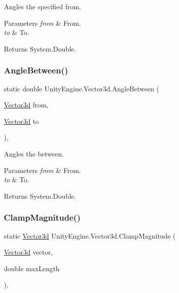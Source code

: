 Angles the specified from. 


\begin{DoxyParams}{Parameters}
{\em from} & From.\\
\hline
{\em to} & To.\\
\hline
\end{DoxyParams}
\begin{DoxyReturn}{Returns}
System.\+Double.
\end{DoxyReturn}
\mbox{\label{struct_unity_engine_1_1_vector3d_a73a3ff3b4a22da103d3eb4b7d4aec560}} 
\subsubsection{\texorpdfstring{Angle\+Between()}{AngleBetween()}}
{\footnotesize\ttfamily static double Unity\+Engine.\+Vector3d.\+Angle\+Between (\begin{DoxyParamCaption}\item[{\hyperlink{struct_unity_engine_1_1_vector3d}{Vector3d}}]{from,  }\item[{\hyperlink{struct_unity_engine_1_1_vector3d}{Vector3d}}]{to }\end{DoxyParamCaption})\hspace{0.3cm}{\ttfamily [inline]}, {\ttfamily [static]}}



Angles the between. 


\begin{DoxyParams}{Parameters}
{\em from} & From.\\
\hline
{\em to} & To.\\
\hline
\end{DoxyParams}
\begin{DoxyReturn}{Returns}
System.\+Double.
\end{DoxyReturn}
\mbox{\label{struct_unity_engine_1_1_vector3d_a00aa99b9411480c0a046a946a842dbdb}} 
\subsubsection{\texorpdfstring{Clamp\+Magnitude()}{ClampMagnitude()}}
{\footnotesize\ttfamily static \hyperlink{struct_unity_engine_1_1_vector3d}{Vector3d} Unity\+Engine.\+Vector3d.\+Clamp\+Magnitude (\begin{DoxyParamCaption}\item[{\hyperlink{struct_unity_engine_1_1_vector3d}{Vector3d}}]{vector,  }\item[{double}]{max\+Length }\end{DoxyParamCaption})\hspace{0.3cm}{\ttfamily [inline]}, {\ttfamily [static]}}



